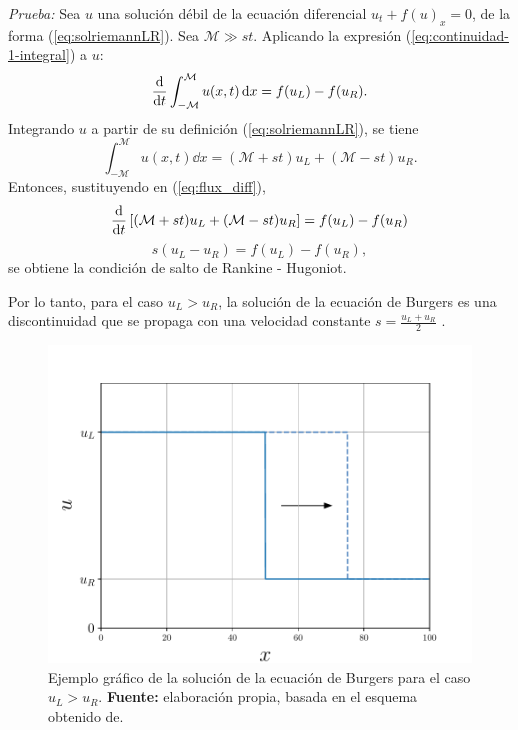 \textit{Prueba:} Sea $u$ una solución débil de la ecuación diferencial $u_t + f(u)_x = 0$, de la forma (\ref{eq:solriemannLR}). Sea $\mathcal{M} \gg st$. Aplicando la expresión (\ref{eq:continuidad-1-integral}) a $u$:
\begin{equation}
	\dv{t} \int_{-\mathcal{M}}^{\mathcal{M}}u(x,t)\dd{x} = f(u_L) - f(u_R).
	\label{eq:flux_diff}
\end{equation}
Integrando $u$ a partir de su definición (\ref{eq:solriemannLR}), se tiene
\begin{equation}
	\int_{-\mathcal{M}}^{\mathcal{M}}u(x,t)\dd{x} = (\mathcal{M} + st)u_L + (\mathcal{M} - st)u_R.
\end{equation}
Entonces, sustituyendo en (\ref{eq:flux_diff}),
\begin{equation}
	\dv{t}\left[(\mathcal{M} + st)u_L + (\mathcal{M} - st)u_R\right] = f(u_L) - f(u_R)
\end{equation}
\begin{equation}
	s(u_L - u_R) = f(u_L) - f(u_R),
\end{equation}
se obtiene la condición de salto de Rankine - Hugoniot.

Por lo tanto, para el caso $u_L > u_R$, la solución de la ecuación de Burgers es una discontinuidad que se propaga con una velocidad constante $s = \frac{u_L + u_R}{2}$ \cite{Cameron}.

\begin{figure}[ht]
	\centering
	\includegraphics[width=0.8\linewidth]{../some_plots/cap1/graficas/riemannLR.pdf}
	\caption{Ejemplo gráfico de la solución de la ecuación de Burgers para el caso $u_L > u_R$. \textbf{Fuente: }elaboración propia, basada en el esquema obtenido de.}
	\label{fig:solriemannLR}
\end{figure}

